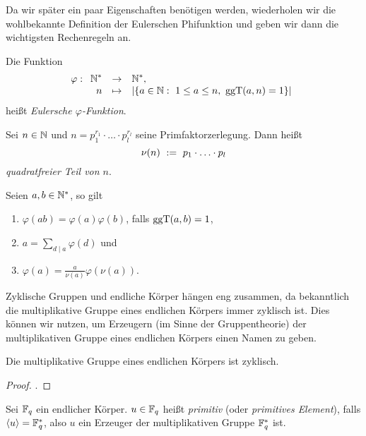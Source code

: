 Da wir später ein paar Eigenschaften benötigen
werden, wiederholen wir die wohlbekannte Definition der Eulerschen
Phifunktion und geben wir dann die wichtigsten Rechenregeln an.

\begin{definition}
  \label{def:euler_phi}
  Die Funktion
  \[ \varphi: \funcdef{\N^\ast &\to& \N^\ast,\\
    n &\mapsto& |\{ a \in \N:\ 1\leq a\leq n,\ \ggT(a,n)=1 \}|}\]
  heißt \emph{Eulersche $\varphi$-Funktion}.
\end{definition}

\begin{definition}
  \label{def:quadratfreier_teil}
  Sei $n \in \mathbb{N}$ und $n = p_1^{r_1}\cdot\ldots\cdot p_l^{r_l}$ seine
  Primfaktorzerlegung. Dann heißt
  \[ \nu(n) \ :=\  p_1\cdot \ldots\cdot p_l\]
  \emph{quadratfreier Teil von $n$}.
\end{definition}


\begin{lemma}
  \label{lemma:rechenregeln_phifunktion}
  Seien $a,b\in\mathbb{N}^\ast$, so gilt
  \begin{enumerate}
    \item $\varphi(ab) = \varphi(a)\varphi(b)$, falls $\operatorname{ggT}(a,b) = 1$,
    \item $a = \sum_{d\mid a} \varphi(d)$ und
    \item $\varphi(a) = \tfrac{a}{\nu(a)}\varphi(\nu(a))$.
  \end{enumerate}
\end{lemma}


Zyklische Gruppen und endliche Körper hängen eng zusammen, da bekanntlich die
multiplikative Gruppe eines endlichen Körpers immer zyklisch ist. Dies können
wir nutzen, um Erzeugern (im Sinne der Gruppentheorie) der multiplikativen
Gruppe eines endlichen Körpers einen Namen zu geben.

\begin{satz}
  \label{satz:mult_gruppe_endl_korper_zyklisch}
  Die multiplikative Gruppe eines endlichen Körpers ist zyklisch.
\end{satz}
\begin{proof}
  \autocite[Theorem 2.8]{lidl1997finite}.
\end{proof}


\begin{definition}[primitiv]
  \label{def:primitiv}
  Sei $\mathbb{F}_q$ ein endlicher Körper. $u\in \mathbb{F}_q$ heißt \emph{primitiv} 
  (oder \emph{primitives Element}), falls $\langle u \rangle = \mathbb{F}_q^\ast$, 
  also $u$ ein Erzeuger der multiplikativen Gruppe $\mathbb{F}_q^\ast$ ist.
\end{definition}


